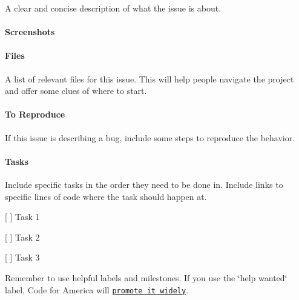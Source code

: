 A clear and concise description of what the issue is about.

\paragraph*{Screenshots}



\paragraph*{Files}

A list of relevant files for this issue. This will help people navigate the project and offer some clues of where to start.

\paragraph*{To Reproduce}

If this issue is describing a bug, include some steps to reproduce the behavior.

\paragraph*{Tasks}

Include specific tasks in the order they need to be done in. Include links to specific lines of code where the task should happen at.
\begin{DoxyItemize}
\item \mbox{[} \mbox{]} Task 1
\item \mbox{[} \mbox{]} Task 2
\item \mbox{[} \mbox{]} Task 3
\end{DoxyItemize}

Remember to use helpful labels and milestones. If you use the \char`\"{}help wanted\char`\"{} label, Code for America will \href{http://www.codeforamerica.org/geeks/civicissues}{\tt promote it widely}. 